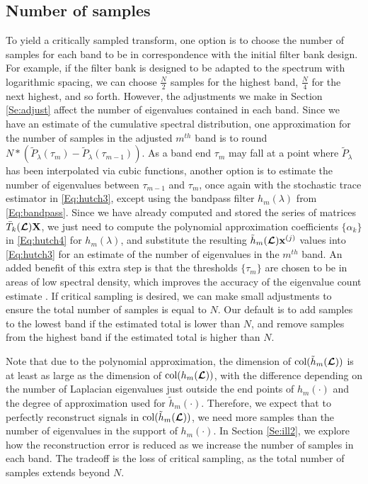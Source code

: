 \documentclass[journal, 10pt]{IEEEtran}
\begin{document}
\subsection{Number of samples}

To yield a critically sampled transform, one option is to choose the number of samples for each band to be in correspondence with the initial filter bank design. For example, if the filter bank is designed to be adapted to the spectrum with logarithmic spacing, we can choose $\frac{N}{2}$ samples for the highest band, $\frac{N}{4}$ for the next highest, and so forth. However, the adjustments we make in Section \ref{Se:adjust} affect the number of eigenvalues contained in each band. Since we have an estimate of the cumulative spectral distribution, one approximation for the number of samples in the adjusted $m^{th}$ band is to round $N*(\tilde{P}_{\lambda}(\tau_{m})-\tilde{P}_{\lambda}(\tau_{m-1}))$. As a band end $\tau_m$ may fall at a point where $\tilde{P}_\lambda$ has been interpolated via cubic functions, another option is to estimate the number of eigenvalues between $\tau_{m-1}$ and $\tau_m$, once again with the stochastic trace estimator in \eqref{Eq:hutch3}, except using the bandpass filter $h_m(\lambda)$ from \eqref{Eq:bandpass}. Since we have already computed and stored the series of matrices $\bar{T}_k(\boldsymbol{\mathcal{L}}){\bf X}$, we just need to compute the polynomial approximation coefficients $\{\alpha_k\}$ in \eqref{Eq:hutch4} for  $h_m(\lambda)$, and substitute the resulting $\tilde{h}_m(\boldsymbol{\mathcal{L}}){\bf x}^{(j)}$ values into \eqref{Eq:hutch3} for an estimate of the number of eigenvalues in the $m^{th}$ band. An added benefit of this extra step is that the thresholds $\{\tau_m\}$ are chosen to be in areas of low spectral density, which improves the accuracy of the eigenvalue count estimate \cite{di2016efficient}. If critical sampling is desired, we can make small adjustments to ensure the total number of samples is equal to $N$. Our default is to add samples to the lowest band if the estimated total is lower than $N$, and remove samples from the highest band if the estimated total is higher than $N$.

Note that due to the polynomial approximation, the dimension of $\hbox{col}(\tilde{h}_m(\boldsymbol{\mathcal{L}}))$ is at least as large as the dimension of $\hbox{col}({h}_m(\boldsymbol{\mathcal{L}}))$, with the difference depending on the number of Laplacian eigenvalues just outside the end points of $h_m(\cdot)$ and the degree of approximation used for $\tilde{h}_m(\cdot)$. Therefore, we expect that to perfectly reconstruct signals in $\hbox{col}(\tilde{h}_m(\boldsymbol{\mathcal{L}}))$, we need more samples than the number of eigenvalues in the support of $h_m(\cdot)$. In Section \ref{Se:ill2}, we explore how the reconstruction error is reduced as we increase the number of samples in each band. The tradeoff is the loss of critical sampling, as the total number of samples extends beyond $N$. 
\end{document}
